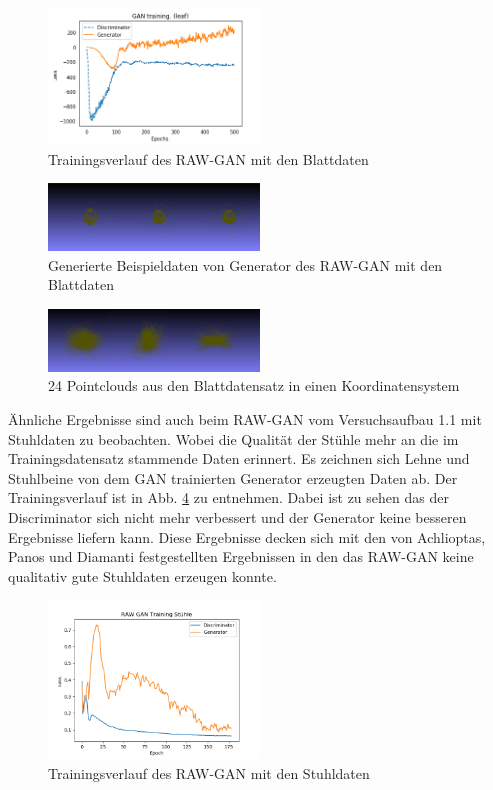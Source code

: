 \documentclass{llncs}
\begin{document}
\begin{figure}[htbp]
	\centering
	\includegraphics[width=0.5\textwidth]{raw_gan_leaf_result.png}
	\caption{Trainingsverlauf des RAW-GAN mit den Blattdaten}
	\label{fig:Bild80}
\end{figure}
\begin{figure}[htbp] 
	\centering
	\includegraphics[width=0.5\textwidth]{raw_gan_leaf_example.png}
	\caption{Generierte Beispieldaten von Generator des RAW-GAN mit den Blattdaten}
	\label{fig:Bild56}
\end{figure}
\begin{figure}[htbp] 
	\centering
	\includegraphics[width=0.5\textwidth]{ansammlung.png}
	\caption{24 Pointclouds aus den Blattdatensatz in einen Koordinatensystem}
	\label{fig:Bild81}
\end{figure}

Ähnliche Ergebnisse sind auch beim RAW-GAN vom Versuchsaufbau 1.1 mit Stuhldaten zu beobachten. Wobei die Qualität der Stühle mehr an die im Trainingsdatensatz stammende Daten erinnert. Es zeichnen sich Lehne und Stuhlbeine von dem GAN trainierten Generator erzeugten Daten ab. Der Trainingsverlauf ist in Abb. \ref{fig:Bild57} zu entnehmen. Dabei ist zu sehen das der Discriminator sich nicht mehr verbessert und der Generator keine besseren Ergebnisse liefern kann. Diese Ergebnisse decken sich mit den von Achlioptas, Panos und Diamanti \cite{3dgan} festgestellten Ergebnissen in den das RAW-GAN keine qualitativ gute Stuhldaten erzeugen konnte. 

\begin{figure}[htbp] 
	\centering
	\includegraphics[width=0.5\textwidth]{raw_gan_chair_result.png}
	\caption{Trainingsverlauf des RAW-GAN mit den Stuhldaten}
	\label{fig:Bild57}
\end{figure}
\end{document}
